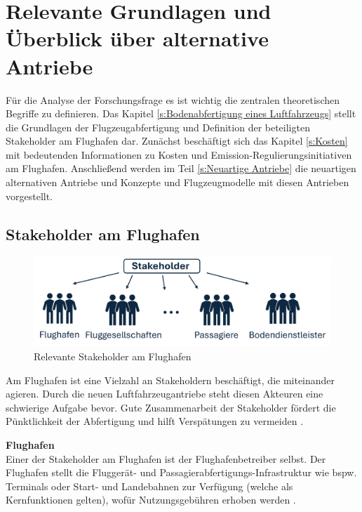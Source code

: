 \chapter{Relevante Grundlagen und Überblick über alternative Antriebe}
\label{ch:Relevante Grundlagen und Überblick über alternative Antriebe}
Für die Analyse der Forschungsfrage es ist wichtig die zentralen theoretischen Begriffe zu definieren. 
Das Kapitel \ref{s:Bodenabfertigung eines Luftfahrzeugs} stellt die Grundlagen der Flugzeugabfertigung und Definition
der beteiligten Stakeholder am Flughafen dar. Zunächst beschäftigt sich das Kapitel \ref{s:Kosten}
mit bedeutenden Informationen zu Kosten und Emission-Regulierungsinitiativen am Flughafen. 
Anschließend werden im Teil \ref{s:Neuartige Antriebe}
die neuartigen alternativen Antriebe und Konzepte und Flugzeugmodelle mit diesen Antrieben vorgestellt.

\section{Stakeholder am Flughafen}
\label{s:Stakeholder am Flughafen}
%
\begin{figure}[h]
	\centering
	\includegraphics[width=0.8\linewidth]{Bilder/Stakeholder.png}
	\caption[Relevante Stakeholder am Flughafen]{Relevante Stakeholder am Flughafen}
	\label{stakeholder}
\end{figure}

Am Flughafen ist eine Vielzahl an Stakeholdern beschäftigt, die miteinander agieren. 
Durch die neuen Luftfahrzeugantriebe steht diesen Akteuren eine schwierige Aufgabe bevor. 
Gute Zusammenarbeit der Stakeholder fördert die Pünktlichkeit der Abfertigung und 
hilft Verspätungen zu vermeiden \cite{schmidt2016challenges}.

\textbf{Flughafen} \\
Einer der Stakeholder am Flughafen ist der Flughafenbetreiber selbst. 
Der Flughafen stellt die Fluggerät- und Passagierabfertigungs-Infrastruktur wie bspw. 
Terminals oder Start- und Landebahnen zur Verfügung (welche als Kernfunktionen gelten), 
wofür Nutzungsgebühren erhoben werden \cite{conrady2019luftverkehr}. %

